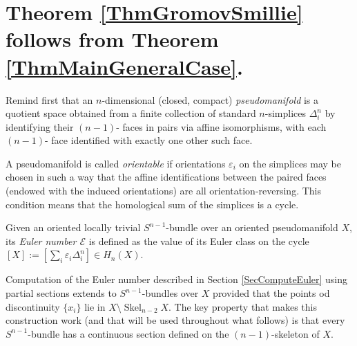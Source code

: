 \documentclass[12pt]{amsart}
\theoremstyle{plain}
\theoremstyle{definition}
\theoremstyle{plain}
\theoremstyle{definition}
\DeclareMathOperator{\Skel}{Skel}
\begin{document}
    
 
      \section{{Theorem \ref{ThmGromovSmillie} follows from  Theorem \ref{ThmMainGeneralCase}. }}\label{SectionFollows}

Remind first that
an $n$-dimensional (closed, compact)\textit{ pseudomanifold} is a quotient space obtained from a finite collection of standard $n$-simplices  $\Delta_i^n$ by identifying their $(n-1)$- faces in pairs via affine isomorphisms, with each $(n-1)$- face identified with exactly one other such face.

    A pseudomanifold  is called \textit{orientable} if  orientations $\varepsilon_i$ on the simplices   may be
chosen in such a way that the affine identifications between the paired faces
(endowed with the induced orientations) are all orientation-reversing. This condition  means that the homological sum of the simplices is a cycle.

\medskip 

Given an oriented locally trivial $S^{n-1}$-bundle over an oriented pseudomanifold $X$, its \textit{ Euler number $\mathcal{E}$} is defined as the value of its Euler class on  the cycle
        $[X]:=[\sum_i \varepsilon_i\Delta^n_i]\in H_n(X)$.
        
        Computation of the Euler number described in Section \ref{SecComputeEuler} using partial sections extends to $S^{n-1}$-bundles over $X$ provided that the  points od discontinuity $\{x_i\}$ lie in $X\setminus \Skel_{n-2}X$.  The key property that makes this construction work (and that will be used throughout what follows) is that every $S^{n-1}$-bundle has a continuous section defined on the $(n-1)$-skeleton of $X$.
\end{document}
